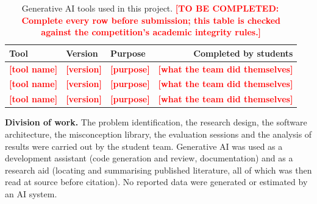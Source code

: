 \documentclass[11pt,a4paper]{article}
\newcommand{\fillin}[1]{\textcolor{red}{\textbf{[TO BE COMPLETED:\,#1]}}}
\newcommand{\fillc}[1]{\textcolor{red}{\textbf{[#1]}}}   %
\begin{document}
\begin{table}[h]
\centering
\small
\begin{tabularx}{\textwidth}{@{}p{3.2cm} p{1.5cm} p{3.0cm} R@{}}
\toprule
\textbf{Tool} & \textbf{Version} & \textbf{Purpose} & \textbf{Completed by students} \\
\midrule
\fillc{tool name} & \fillc{version} & \fillc{purpose} & \fillc{what the team did themselves} \\
\fillc{tool name} & \fillc{version} & \fillc{purpose} & \fillc{what the team did themselves} \\
\fillc{tool name} & \fillc{version} & \fillc{purpose} & \fillc{what the team did themselves} \\
\bottomrule
\end{tabularx}
\caption{Generative AI tools used in this project. \fillin{Complete every row before
submission; this table is checked against the competition's academic integrity rules.}}
\label{tab:ai}
\end{table}

\textbf{Division of work.} The problem identification, the research design, the software
architecture, the misconception library, the evaluation sessions and the analysis of results
were carried out by the student team. Generative AI was used as a development assistant
(code generation and review, documentation) and as a research aid (locating and summarising
published literature, all of which was then read at source before citation). No reported
data were generated or estimated by an AI system.
\end{document}
